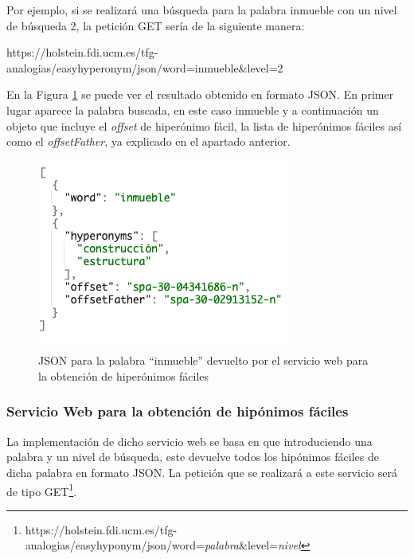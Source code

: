 Por ejemplo, si se realizará una búsqueda para la palabra inmueble con un nivel de búsqueda 2, la petición GET sería de la siguiente manera:

https://holstein.fdi.ucm.es/tfg-analogias/easyhyperonym/json/word=inmueble\&level=2

En la Figura \ref{fig:peticionGetEasyHyperonym} se puede ver el resultado obtenido en formato JSON. En primer lugar aparece la palabra buscada, en este caso inmueble y a continuación un objeto que incluye el \textit{offset} de hiperónimo fácil, la lista de hiperónimos fáciles así como el \textit{offsetFather}, ya explicado en el apartado anterior.

\begin{figure}[!h]
	\includegraphics[width=.6\textwidth]{Imagenes/Bitmap/Capitulo4/JSON-SW/peticionGetEasyHyperonym.png}
	\centering
	\caption{JSON para la palabra ``inmueble'' devuelto por el servicio web para la obtención de hiperónimos fáciles}
	\label{fig:peticionGetEasyHyperonym}
\end{figure}


\subsubsection{Servicio Web para la obtención de hipónimos fáciles}
\label{cap:subsec:sw_hiponimosfaciles}
La implementación de dicho servicio web se basa en que introduciendo una palabra y un nivel de búsqueda, este devuelve todos los hipónimos fáciles de dicha palabra en formato JSON. La petición que se realizará a este servicio será de tipo GET\footnote{https://holstein.fdi.ucm.es/tfg-analogias/easyhyponym/json/word=\textit{palabra}\&level=\textit{nivel}}.

